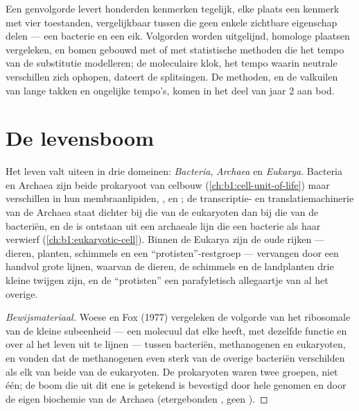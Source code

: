 \begin{remark}\label{rem:b1:classifying-biodiversity:molecular}
Een genvolgorde levert honderden kenmerken tegelijk, elke plaats een kenmerk
met vier toestanden, vergelijkbaar tussen  die geen enkele
zichtbare eigenschap delen --- een bacterie en een eik. Volgorden worden
uitgelijnd, homologe plaatsen vergeleken, en bomen gebouwd met 
of met statistische methoden die het tempo van de substitutie modelleren; de
moleculaire klok, het tempo waarin neutrale verschillen zich ophopen, dateert
de splitsingen. De methoden, en de valkuilen van lange takken en ongelijke
tempo's, komen in het deel van jaar 2 aan bod.
\end{remark}

\section{De levensboom}

\begin{proposition}\label{prop:b1:classifying-biodiversity:domains}
Het leven valt uiteen in drie domeinen: \emph{Bacteria}, \emph{Archaea} en
\emph{Eukarya}. Bacteria en Archaea zijn beide prokaryoot van celbouw
(\cref{ch:b1:cell-unit-of-life}) maar verschillen in hun membraanlipiden,
,  en ; de transcriptie- en
translatiemachinerie van de Archaea staat dichter bij die van de eukaryoten
dan bij die van de bacteriën, en de  is ontstaan uit een
archaeale lijn die een bacterie als haar  verwierf
(\cref{ch:b1:eukaryotic-cell}). Binnen de Eukarya zijn de oude rijken ---
dieren, planten, schimmels en een ``protisten''-restgroep --- vervangen door
een handvol grote lijnen, waarvan de dieren, de schimmels en de landplanten
drie kleine twijgen zijn, en de ``protisten'' een parafyletisch allegaartje
van al het overige.
\end{proposition}
\begin{proof}[Bewijsmateriaal]
Woese en Fox (1977) vergeleken de volgorde van het ribosomale  van de
kleine subeenheid --- een molecuul dat elke  heeft, met dezelfde functie
en over al het leven uit te lijnen --- tussen bacteriën, methanogenen en
eukaryoten, en vonden dat de methanogenen even sterk van de overige
bacteriën verschilden als elk van beide van de eukaryoten. De prokaryoten
waren twee groepen, niet één; de boom die uit dit ene  is getekend is
bevestigd door hele genomen en door de eigen biochemie van de Archaea
(etergebonden , geen ).
\end{proof}

